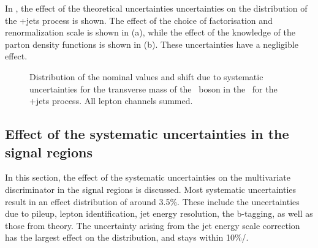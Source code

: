 \newpage
In , the effect of the theoretical uncertainties uncertainties on the distribution of the \WZ+jets process is shown. The effect of the choice of factorisation and renormalization scale is shown in  (a), while the effect of the knowledge of the parton density functions is shown in  (b). These uncertainties have a negligible effect. 
\begin{figure}[htbp] 
	\centering 

	\caption{Distribution of the nominal values and shift due to  systematic uncertainties for the transverse mass of the \PW\ boson in the \WZCR\ for the \WZ+jets process. All lepton channels summed.}
	\label{fig:shiftMTWt}
\end{figure}


\subsection{Effect of the systematic uncertainties in the signal regions}
\label{sec:BDTsys}
In this section, the effect of the systematic uncertainties on the multivariate discriminator in the signal regions is discussed.  Most systematic uncertainties result in an effect distribution of around 3.5\%. These include the uncertainties due to pileup,  lepton identification, jet energy resolution, the b-tagging, as well as those from theory. The uncertainty arising from the jet energy scale correction has the largest effect on the distribution, and stays within 10\%/. 


